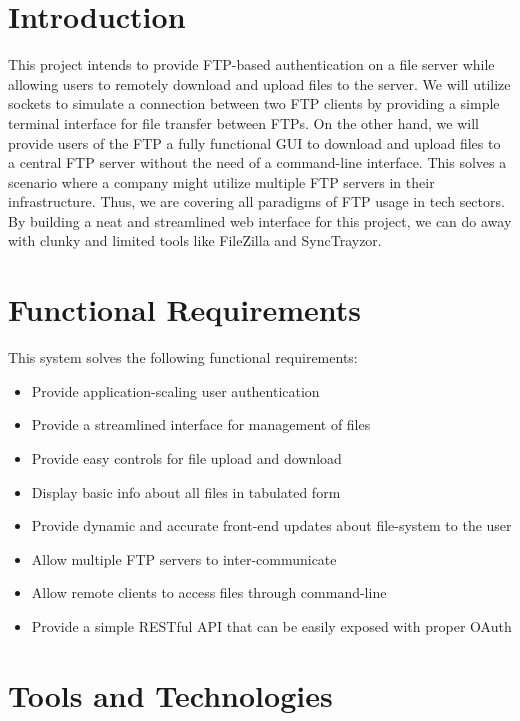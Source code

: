\documentclass[12pt]{article}
\begin{document}
\pagebreak

\setlength{\parindent}{0pt}
\setlength{\parskip}{1em}

\section{Introduction}
This project intends to provide FTP-based authentication on a file server
while allowing users to remotely download and upload files to the server.
We will utilize sockets to simulate a connection between two FTP clients by providing a
simple terminal interface for file transfer between FTPs. On the other hand, we will provide
users of the FTP a fully functional GUI to download and upload files to a central FTP server 
without the need of a command-line interface.
This solves a scenario where a company might utilize multiple FTP servers in their
infrastructure. Thus, we are covering all paradigms of FTP usage in tech sectors.
By building a neat and streamlined web interface for this project,
we can do away with clunky and limited tools like FileZilla and SyncTrayzor.

\section{Functional Requirements}
This system solves the following functional requirements:
\begin{itemize}
	\item Provide application-scaling user authentication
	\item Provide a streamlined interface for management of files
	\item Provide easy controls for file upload and download
	\item Display basic info about all files in tabulated form
	\item Provide dynamic and accurate front-end updates about file-system to the user
	\item Allow multiple FTP servers to inter-communicate
	\item Allow remote clients to access files through command-line
	\item Provide a simple RESTful API that can be easily exposed with proper OAuth
\end{itemize}

\section{Tools and Technologies}
\end{document}
